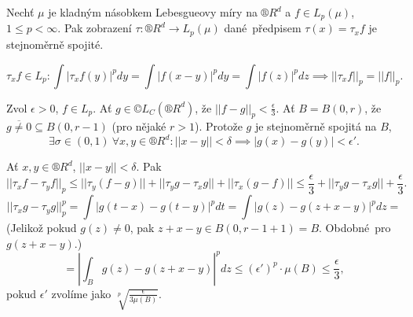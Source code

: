 \documentclass[12pt]{article}					%
\begin{document}
\begin{veta}
	Nechť $\mu$ je kladným násobkem Lebesgueovy míry na $®R^d$ a $f \in L_p(\mu)$, $1 ≤ p < ∞$. Pak zobrazení $\tau: ®R^d \rightarrow L_p(\mu)$ dané předpisem $\tau(x) = \tau_x f$ je stejnoměrně spojité.

	\begin{dukazin}
		$$ \tau_x f \in L_p: \int |\tau_x f(y)|^p dy = \int |f(x - y)|^p dy = \int |f(z)|^p dz \implies ||\tau_x f||_p = ||f||_p. $$

		Zvol $\epsilon > 0$, $f \in L_p$. Ať $g \in ©L_C (®R^d)$, že $||f - g||_p < \frac{\epsilon}{3}$. Ať $B = B(0, r)$, že $\overline{g ≠ 0} \subseteq B(0, r - 1)$ (pro nějaké $r > 1$). Protože $g$ je stejnoměrně spojitá na $B$,
		$$ \exists \sigma \in (0, 1)\ \forall x, y \in ®R^d: ||x - y|| < \delta \implies |g(x) - g(y)| < \epsilon'. $$

		Ať $x, y \in ®R^d$, $||x - y|| < \delta$. Pak
		$$ ||\tau_x f - \tau_y f||_p ≤ ||\tau_y (f - g)|| + ||\tau_y g - \tau_x g|| + ||\tau_x(g - f)|| ≤ \frac{\epsilon}{3} + ||\tau_y g - \tau_x g|| + \frac{\epsilon}{3}. $$
		$$ ||\tau_x g - \tau_y g||_p^p = \int |g(t - x) - g(t - y)|^p dt = \int |g(z) - g(z + x - y)|^p dz = $$
		(Jelikož pokud $g(z) ≠ 0$, pak $z + x - y \in B(0, r - 1 + 1) = B$. Obdobné pro $g(z + x - y)$.)
		$$ = |\int_B g(z) - g(z + x - y)|^p dz ≤ (\epsilon')^p·\mu(B) ≤ \frac{\epsilon}{3}, $$
		pokud $\epsilon'$ zvolíme jako $\sqrt[p]{\frac{\epsilon}{3\mu(B)}}$.
	\end{dukazin}
\end{veta}
\end{document}
